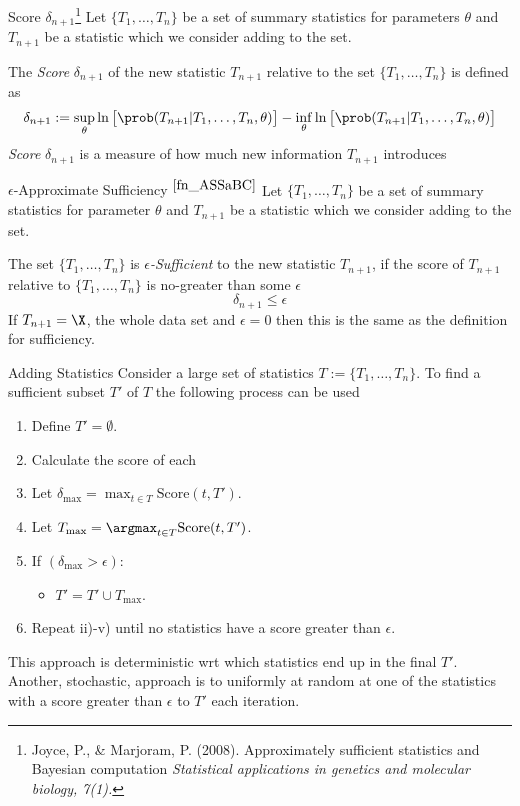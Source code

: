 \documentclass[11pt,a4paper]{article}
\begin{document}
  \begin{definition}{Score $\delta_{n+1}$\footnote{\label{fn_ASSaBC}Joyce, P., \& Marjoram, P. (2008). Approximately sufficient statistics and Bayesian computation \textit{Statistical applications in genetics and molecular biology, 7(1).}}}
    Let $\{T_1,\dots,T_n\}$ be a set of summary statistics for parameters $\theta$ and $T_{n+1}$ be a statistic which we consider adding to the set.
    \par The \textit{Score} $\delta_{n+1}$ of the new statistic $T_{n+1}$ relative to the set $\{T_1,\dots,T_n\}$ is defined as
    \[ \delta_{n+1}:=\sup_\theta\ln\big[\prob(T_{n+1}|T_1,\dots,T_n,\theta)\big]-\inf_\theta\ln\big[\prob(T_{n+1}|T_1,\dots,T_n,\theta)\big] \]
    \textit{Score} $\delta_{n+1}$ is a measure of how much new information $T_{n+1}$ introduces
  \end{definition}

  \begin{definition}{$\epsilon$-Approximate Sufficiency \textsuperscript{$\ref{fn_ASSaBC}$}}
    Let $\{T_1,\dots,T_n\}$ be a set of summary statistics for parameter $\theta$ and $T_{n+1}$ be a statistic which we consider adding to the set.
    \par The set $\{T_1,\dots,T_n\}$ is \textit{$\epsilon$-Sufficient} to the new statistic $T_{n+1}$, if the score of $T_{n+1}$ relative to $\{T_1,\dots,T_n\}$ is no-greater than some $\epsilon$
    \[ \delta_{n+1}\leq\epsilon \]
    If $T_{n+1}=\X$, the whole data set and $\epsilon=0$ then this is the same as the definition for sufficiency.
  \end{definition}

  \begin{remark}{Adding Statistics}
    Consider a large set of statistics $T:=\{T_1,\dots,T_n\}$. To find a sufficient subset $T'$ of $T$ the following process can be used
    \begin{enumerate}
      \item Define $T'=\emptyset$.
      \item Calculate the score of each
      \item Let $\delta_\text{max}=\max_{t\in T}\text{Score}(t,T')$.
      \item Let $T_\text{max}=\argmax_{t\in T}\text{Score}(t,T')$.
      \item If $(\delta_\text{max}>\epsilon)$:
      \begin{itemize}
        \item $T'=T'\cup T_\text{max}$.
      \end{itemize}
      \item Repeat ii)-v) until no statistics have a score greater than $\epsilon$.
    \end{enumerate}
    This approach is deterministic wrt which statistics end up in the final $T'$. Another, stochastic, approach is to uniformly at random at one of the statistics with a score greater than $\epsilon$ to $T'$ each iteration.
  \end{remark}
\end{document}
